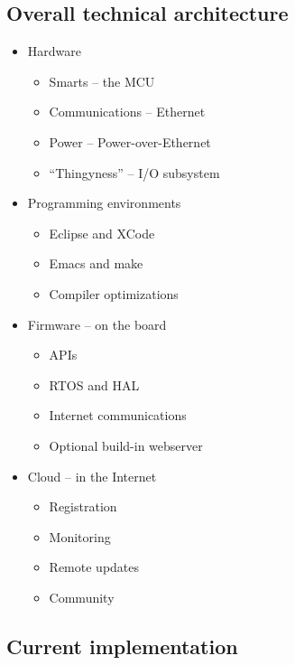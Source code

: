 \documentclass[draft,a4paper]{siamltex}
\begin{document}
\subsection{Overall technical architecture}

\begin{itemize}
  \item Hardware
    \begin{itemize}
    \item Smarts -- the MCU
    \item Communications -- Ethernet
    \item Power -- Power-over-Ethernet
    \item ``Thingyness'' -- I/O subsystem
    \end{itemize}
  \item Programming environments
    \begin{itemize}
    \item Eclipse and XCode
    \item Emacs and make
    \item Compiler optimizations
    \end{itemize}
  \item Firmware -- on the board
    \begin{itemize}
    \item APIs
    \item RTOS and HAL
    \item Internet communications
    \item Optional build-in webserver
    \end{itemize}
  \item Cloud -- in the Internet
    \begin{itemize}
    \item Registration
    \item Monitoring
    \item Remote updates
    \item Community
    \end{itemize}
\end{itemize}

\subsection{Current implementation}
\end{document}
